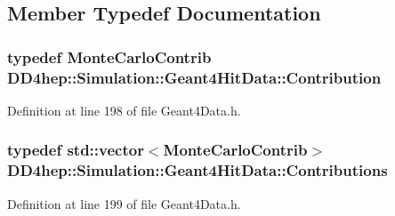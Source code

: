 \subsection{Member Typedef Documentation}
\hypertarget{class_d_d4hep_1_1_simulation_1_1_geant4_hit_data_aec2f53237eac2db7d83dd03bca8719c5}{
\subsubsection[{Contribution}]{\setlength{\rightskip}{0pt plus 5cm}typedef {\bf MonteCarloContrib} {\bf DD4hep::Simulation::Geant4HitData::Contribution}}}
\label{class_d_d4hep_1_1_simulation_1_1_geant4_hit_data_aec2f53237eac2db7d83dd03bca8719c5}


Definition at line 198 of file Geant4Data.h.\hypertarget{class_d_d4hep_1_1_simulation_1_1_geant4_hit_data_aee3759a12612c2f2712e44f87e343a2f}{
\subsubsection[{Contributions}]{\setlength{\rightskip}{0pt plus 5cm}typedef std::vector$<${\bf MonteCarloContrib}$>$ {\bf DD4hep::Simulation::Geant4HitData::Contributions}}}
\label{class_d_d4hep_1_1_simulation_1_1_geant4_hit_data_aee3759a12612c2f2712e44f87e343a2f}


Definition at line 199 of file Geant4Data.h.

